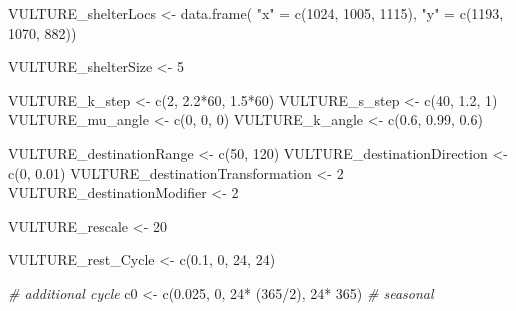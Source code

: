 \documentclass[10pt,a4paper]{article}
\newenvironment{Shaded}{}{}
\newcommand{\CommentTok}[1]{\textit{#1}}
\newcommand{\DecValTok}[1]{#1}
\newcommand{\FloatTok}[1]{#1}
\newcommand{\FunctionTok}[1]{#1}
\newcommand{\NormalTok}[1]{#1}
\newcommand{\OtherTok}[1]{#1}
\newcommand{\SpecialCharTok}[1]{#1}
\newcommand{\StringTok}[1]{#1}
\begin{document}
\begin{Shaded}
\begin{Highlighting}[]
\NormalTok{VULTURE\_shelterLocs }\OtherTok{\textless{}{-}} \FunctionTok{data.frame}\NormalTok{(}
  \StringTok{"x"} \OtherTok{=} \FunctionTok{c}\NormalTok{(}\DecValTok{1024}\NormalTok{, }\DecValTok{1005}\NormalTok{, }\DecValTok{1115}\NormalTok{),}
  \StringTok{"y"} \OtherTok{=} \FunctionTok{c}\NormalTok{(}\DecValTok{1193}\NormalTok{, }\DecValTok{1070}\NormalTok{, }\DecValTok{882}\NormalTok{))}

\NormalTok{VULTURE\_shelterSize }\OtherTok{\textless{}{-}} \DecValTok{5}


\NormalTok{VULTURE\_k\_step }\OtherTok{\textless{}{-}} \FunctionTok{c}\NormalTok{(}\DecValTok{2}\NormalTok{, }\FloatTok{2.2}\SpecialCharTok{*}\DecValTok{60}\NormalTok{, }\FloatTok{1.5}\SpecialCharTok{*}\DecValTok{60}\NormalTok{)}
\NormalTok{VULTURE\_s\_step }\OtherTok{\textless{}{-}} \FunctionTok{c}\NormalTok{(}\DecValTok{40}\NormalTok{, }\FloatTok{1.2}\NormalTok{, }\DecValTok{1}\NormalTok{)}
\NormalTok{VULTURE\_mu\_angle }\OtherTok{\textless{}{-}} \FunctionTok{c}\NormalTok{(}\DecValTok{0}\NormalTok{, }\DecValTok{0}\NormalTok{, }\DecValTok{0}\NormalTok{)}
\NormalTok{VULTURE\_k\_angle }\OtherTok{\textless{}{-}} \FunctionTok{c}\NormalTok{(}\FloatTok{0.6}\NormalTok{, }\FloatTok{0.99}\NormalTok{, }\FloatTok{0.6}\NormalTok{)}

\NormalTok{VULTURE\_destinationRange }\OtherTok{\textless{}{-}} \FunctionTok{c}\NormalTok{(}\DecValTok{50}\NormalTok{, }\DecValTok{120}\NormalTok{)}
\NormalTok{VULTURE\_destinationDirection }\OtherTok{\textless{}{-}} \FunctionTok{c}\NormalTok{(}\DecValTok{0}\NormalTok{, }\FloatTok{0.01}\NormalTok{)}
\NormalTok{VULTURE\_destinationTransformation }\OtherTok{\textless{}{-}} \DecValTok{2}
\NormalTok{VULTURE\_destinationModifier }\OtherTok{\textless{}{-}} \DecValTok{2}

\NormalTok{VULTURE\_rescale }\OtherTok{\textless{}{-}} \DecValTok{20}


\NormalTok{VULTURE\_rest\_Cycle }\OtherTok{\textless{}{-}} \FunctionTok{c}\NormalTok{(}\FloatTok{0.1}\NormalTok{, }\DecValTok{0}\NormalTok{, }\DecValTok{24}\NormalTok{, }\DecValTok{24}\NormalTok{)}

\CommentTok{\# additional cycle}
\NormalTok{c0 }\OtherTok{\textless{}{-}} \FunctionTok{c}\NormalTok{(}\FloatTok{0.025}\NormalTok{, }\DecValTok{0}\NormalTok{, }\DecValTok{24}\SpecialCharTok{*}\NormalTok{ (}\DecValTok{365}\SpecialCharTok{/}\DecValTok{2}\NormalTok{), }\DecValTok{24}\SpecialCharTok{*} \DecValTok{365}\NormalTok{) }\CommentTok{\# seasonal}


\end{Highlighting}
\end{Shaded}
\end{document}
